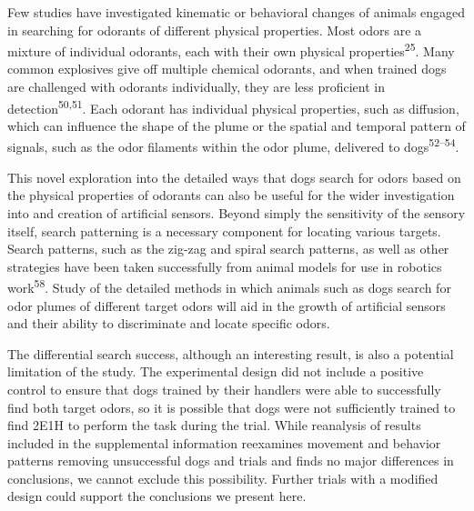 \documentclass[
]{article}
\begin{document}
Few studies have investigated kinematic or behavioral changes of animals engaged in searching for odorants of different physical properties. Most odors are a mixture of individual odorants, each with their own physical properties\textsuperscript{25}. Many common explosives give off multiple chemical odorants, and when trained dogs are challenged with odorants individually, they are less proficient in detection\textsuperscript{50,51}. Each odorant has individual physical properties, such as diffusion, which can influence the shape of the plume or the spatial and temporal pattern of signals, such as the odor filaments within the odor plume, delivered to dogs\textsuperscript{52--54}.

This novel exploration into the detailed ways that dogs search for odors based on the physical properties of odorants can also be useful for the wider investigation into and creation of artificial sensors. Beyond simply the sensitivity of the sensory itself, search patterning is a necessary component for locating various targets. Search patterns, such as the zig-zag and spiral search patterns, as well as other strategies have been taken successfully from animal models for use in robotics work\textsuperscript{58}. Study of the detailed methods in which animals such as dogs search for odor plumes of different target odors will aid in the growth of artificial sensors and their ability to discriminate and locate specific odors.

The differential search success, although an interesting result, is also a potential limitation of the study. The experimental design did not include a positive control to ensure that dogs trained by their handlers were able to successfully find both target odors, so it is possible that dogs were not sufficiently trained to find 2E1H to perform the task during the trial. While reanalysis of results included in the supplemental information reexamines movement and behavior patterns removing unsuccessful dogs and trials and finds no major differences in conclusions, we cannot exclude this possibility. Further trials with a modified design could support the conclusions we present here.
\end{document}
